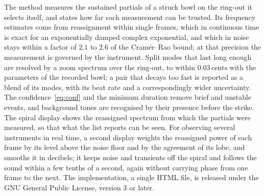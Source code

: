 \documentclass[10pt,a4paper,twocolumn]{article}
\newcommand{\ct}{\,\mathrm{cents}}
\begin{document}
The method measures the sustained partials of a struck bowl on the ring-out it selects itself, and states how far each measurement can be trusted. Its frequency estimates come from reassignment within single frames, which in continuous time is exact for an exponentially damped complex exponential, and which in noise stays within a factor of $2.1$ to $2.6$ of the Cram\'er--Rao bound; at that precision the measurement is governed by the instrument. Split modes that last long enough are resolved by a zoom spectrum over the ring-out, to within $0.03\ct$ with the parameters of the recorded bowl; a pair that decays too fast is reported as a blend of its modes, with its beat rate and a correspondingly wider uncertainty. The confidence~\eqref{eq:conf} and the minimum duration remove brief and unstable events, and background tones are recognised by their presence before the strike. The spiral display shows the reassigned spectrum from which the partials were measured, so that what the list reports can be seen. For observing several instruments in real time, a second display weights the reassigned power of each frame by its level above the noise floor and by the agreement of its lobe, and smooths it in decibels; it keeps noise and transients off the spiral and follows the sound within a few tenths of a second, again without carrying phase from one frame to the next. The implementation, a single HTML file, is released under the GNU General Public License, version 3 or later.
\end{document}

